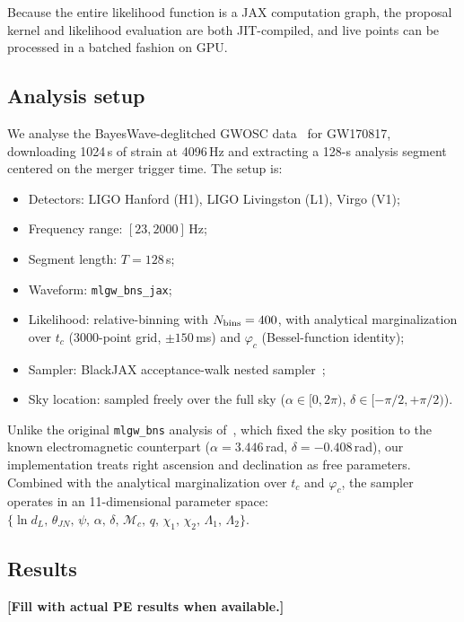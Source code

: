 \documentclass[twocolumn,superscriptaddress,nofootinbib,aps,prd]{revtex4-2}
\newcommand{\tbd}[1]{{\color{red}\textbf{[#1]}}}
\begin{document}
Because the entire likelihood function is a JAX computation graph, the
proposal kernel and likelihood evaluation are both JIT-compiled, and live
points can be processed in a batched fashion on GPU.

\subsection{Analysis setup}

We analyse the BayesWave-deglitched GWOSC data~\cite{GWOSC} for GW170817,
downloading 1024\,s of strain at 4096\,Hz and extracting a 128-s analysis
segment centered on the merger trigger time.  The setup is:
\begin{itemize}
    \item Detectors: LIGO Hanford (H1), LIGO Livingston (L1), Virgo (V1);
    \item Frequency range: $[23, 2000]$\,Hz;
    \item Segment length: $T = 128$\,s;
    \item Waveform: \texttt{mlgw\_bns\_jax};
    \item Likelihood: relative-binning with $N_{\rm bins} = 400$, with
          analytical marginalization over $t_c$ (3000-point grid,
          $\pm150$\,ms) and $\varphi_c$ (Bessel-function identity);
    \item Sampler: BlackJAX acceptance-walk nested sampler~\cite{BlackJAX};
    \item Sky location: sampled freely over the full sky
          ($\alpha \in [0, 2\pi)$, $\delta \in [-\pi/2, +\pi/2)$).
\end{itemize}

Unlike the original \texttt{mlgw\_bns} analysis of~\cite{Tissino:2022},
which fixed the sky position to the known electromagnetic counterpart
($\alpha = 3.446$\,rad, $\delta = -0.408$\,rad), our implementation
treats right ascension and declination as free parameters.  Combined
with the analytical marginalization over $t_c$ and $\varphi_c$, the
sampler operates in an 11-dimensional parameter space:
$\{\ln d_L,\, \theta_{JN},\, \psi,\, \alpha,\, \delta,\,
  \mathcal{M}_c,\, q,\, \chi_1,\, \chi_2,\, \Lambda_1,\, \Lambda_2\}$.

\subsection{Results}

\tbd{Fill with actual PE results when available.}
\end{document}

